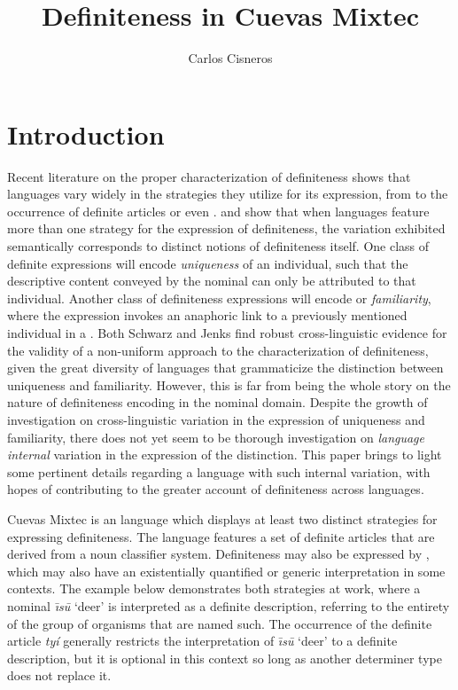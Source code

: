 \documentclass[output=paper,modfonts,nonflat]{langsci/langscibook}
\title{Definiteness in Cuevas Mixtec}
\author{Carlos Cisneros\affiliation{University of Chicago}}
\begin{document}
\maketitle

\section{Introduction} \label{sec:cisneros:1}

Recent literature on the proper characterization of definiteness shows that languages vary widely in the strategies they utilize for its expression, from  to the occurrence of definite articles or even .  \citet{Schwarz2009} and \citet{Jenks2015} show that when languages feature more than one strategy for the expression of definiteness, the variation exhibited semantically corresponds to distinct notions of definiteness itself.  One class of definite expressions will encode \textit{uniqueness} of an individual, such that the descriptive content conveyed by the nominal can only be attributed to that individual.  Another class of definiteness expressions will encode  or \textit{familiarity}, where the expression invokes an anaphoric link to a previously mentioned individual in a . Both Schwarz and Jenks find robust cross-linguistic evidence for the validity of a non-uniform approach to the characterization of definiteness, given the great diversity of languages that grammaticize the distinction between uniqueness and familiarity.  However, this is far from being the whole story on the nature of definiteness encoding in the nominal domain.  Despite the growth of investigation on cross-linguistic variation in the expression of uniqueness and familiarity, there does not yet seem to be thorough investigation on \textit{language internal} variation in the expression of the distinction.  This paper brings to light some pertinent details regarding a language with such internal variation, with hopes of contributing to the greater account of definiteness across languages.

Cuevas Mixtec is an  language which displays at least two distinct strategies for expressing definiteness.  The language features a set of definite articles that are derived from a noun classifier system.  Definiteness may also be expressed by , which may also have an existentially quantified or generic interpretation in some contexts.  The example below demonstrates both strategies at work, where a nominal \textit{\=\i s\=u} `deer' is interpreted as a definite description, referring to the entirety of the group of organisms that are named such.  The occurrence of the definite article \textit{ty\'i} generally restricts the interpretation of \textit{\=\i s\=u} `deer' to a definite description, but it is optional in this context so long as another determiner type does not replace it.
\end{document}
